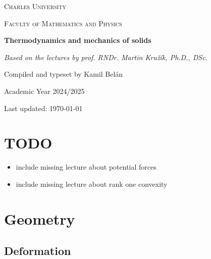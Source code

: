 \documentclass[11pt]{scrartcl} %
\date{\today}
\author{Kamil Belan}
\begin{document}
\begin{titlepage}
  \centering
  \vspace*{2cm}
  
  {\scshape\LARGE Charles University \par}
  \vspace{0.5cm}
  {\scshape\Large Faculty of Mathematics and Physics\par}
  \vspace{1.5cm}
  
  {\huge\bfseries Thermodynamics and mechanics of solids\par}
  \vspace{0.5cm}
  {\Large\itshape Based on the lectures by prof. RNDr. Martin Kružík, Ph.D., DSc.\par}
  
  \vspace{2cm}
  
  \vfill
  
  {\large Compiled and typeset by Kamil Belán\par}
  \vspace{0.5cm}
  {\large Academic Year 2024/2025\par}
  \vspace{0.2cm}
  {\large Last updated: \today\par}
  
\end{titlepage}

\tableofcontents
\newpage 

\section{TODO}
\label{sec:todo}

\begin{itemize}
	\item include missing lecture about potential forces 
	\item include missing lecture about rank one convexity
\end{itemize}

\section{Geometry}
\label{sec:geometry}

\subsection{Deformation}
\label{sec:deformation}
\end{document}
